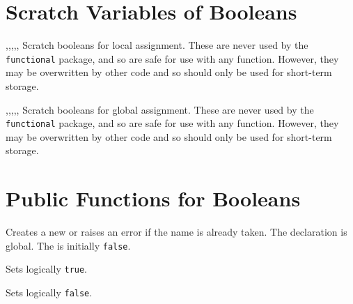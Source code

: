 \documentclass[oneside]{book}
\begin{document}
\section{Scratch Variables of Booleans}

\begin{variable}{\lTmpaBool,\lTmpbBool,\lTmpcBool,\lTmpiBool,\lTmpjBool,\lTmpkBool}
Scratch booleans for local assignment. These are never used by
the \verb!functional! package, and so are safe for use with any
function. However, they may be overwritten by other
code and so should only be used for short-term storage.
\end{variable}

\begin{variable}{\gTmpaBool,\gTmpbBool,\gTmpcBool,\gTmpiBool,\gTmpjBool,\gTmpkBool}
Scratch booleans for global assignment. These are never used by
the \verb!functional! package, and so are safe for use with any
function. However, they may be overwritten by other
code and so should only be used for short-term storage.
\end{variable}


\section{Public Functions for Booleans}

\begin{function}{\BoolNew}
\begin{syntax}
 
\end{syntax}
Creates a new  or raises an error if the
name is already taken. The declaration is global. The
 is initially \texttt{false}.
\end{function}

\begin{function}{\BoolSetTrue}
\begin{syntax}
 
\end{syntax}
Sets  logically \texttt{true}.
\end{function}

\begin{function}{\BoolSetFalse}
\begin{syntax}
 
\end{syntax}
Sets  logically \texttt{false}.
\end{function}
\end{document}
